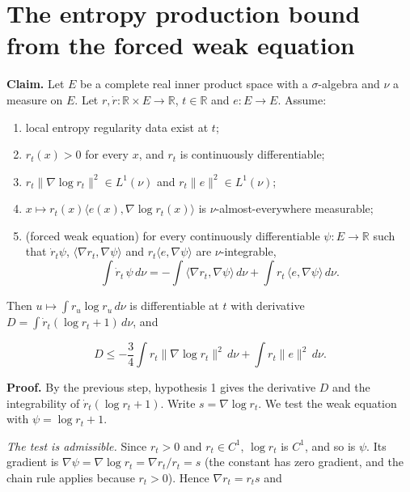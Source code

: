 \documentclass[11pt,a4paper]{article}
\begin{document}
\section{\texorpdfstring{The entropy production bound from the forced weak equation}{The entropy production bound from the forced weak equation}}


\textbf{Claim.} Let \(E\) be a complete real inner product space with a \(\sigma\)-algebra and \(\nu\) a measure on \(E\). Let \(r,\dot r:\mathbb R\times E\to\mathbb R\), \(t\in\mathbb R\) and \(e:E\to E\). Assume:



\begin{enumerate}


\item local entropy regularity data exist at \(t\);

\item \(r_t(x)>0\) for every \(x\), and \(r_t\) is continuously differentiable;

\item \(r_t\|\nabla\log r_t\|^2\in L^1(\nu)\) and \(r_t\|e\|^2\in L^1(\nu)\);

\item \(x\mapsto r_t(x)\langle e(x),\nabla\log r_t(x)\rangle\) is \(\nu\)-almost-everywhere measurable;

\item (forced weak equation) for every continuously differentiable \(\psi:E\to\mathbb R\) such that \(\dot r_t\psi\), \(\langle\nabla r_t,\nabla\psi\rangle\) and \(r_t\langle e,\nabla\psi\rangle\) are \(\nu\)-integrable,
\[\int\dot r_t\,\psi\,d\nu=-\int\langle\nabla r_t,\nabla\psi\rangle\,d\nu+\int r_t\,\langle e,\nabla\psi\rangle\,d\nu.\]

\end{enumerate}



Then \(u\mapsto\int r_u\log r_u\,d\nu\) is differentiable at \(t\) with derivative \(D=\int\dot r_t(\log r_t+1)\,d\nu\), and


\[D\le-\frac34\int r_t\|\nabla\log r_t\|^2\,d\nu+\int r_t\|e\|^2\,d\nu.\]


\textbf{Proof.} By the previous step, hypothesis 1 gives the derivative \(D\) and the integrability of \(\dot r_t(\log r_t+1)\). Write \(s=\nabla\log r_t\). We test the weak equation with \(\psi=\log r_t+1\).




\emph{The test is admissible.} Since \(r_t>0\) and \(r_t\in C^1\), \(\log r_t\) is \(C^1\), and so is \(\psi\). Its gradient is \(\nabla\psi=\nabla\log r_t=\nabla r_t/r_t=s\) (the constant has zero gradient, and the chain rule applies because \(r_t>0\)). Hence \(\nabla r_t=r_ts\) and
\end{document}
